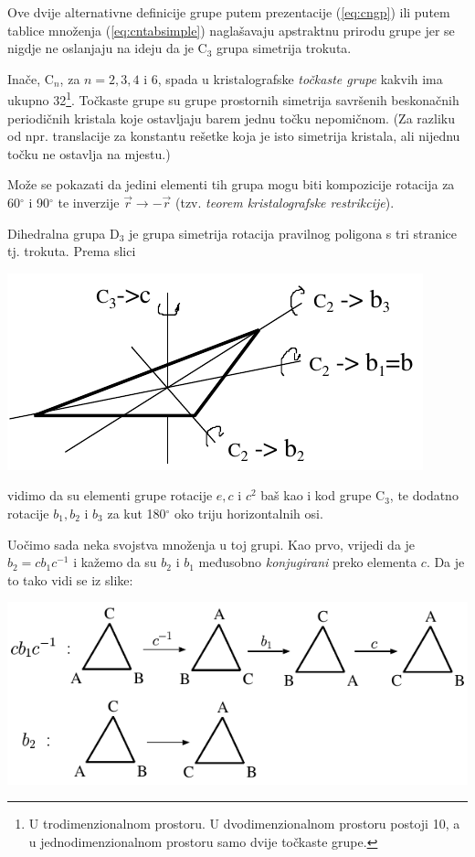 Ove dvije alternativne definicije grupe putem prezentacije (\ref{eq:cngp}) ili
putem tablice množenja (\ref{eq:cntabsimple}) 
naglašavaju apstraktnu prirodu grupe jer se nigdje ne oslanjaju
na ideju da je C$_3$ grupa simetrija trokuta.

Inače, C$_n$, za $n=2,3,4$ i $6$, spada u kristalografske \emph{točkaste grupe} kakvih
ima ukupno 32\footnote{U trodimenzionalnom prostoru. U dvodimenzionalnom prostoru postoji 10, a u
jednodimenzionalnom prostoru samo dvije točkaste grupe.}. 
Točkaste grupe su grupe prostornih simetrija savršenih beskonačnih
periodičnih kristala koje ostavljaju barem jednu točku nepomičnom. (Za
razliku od npr. translacije za konstantu rešetke koja je isto simetrija
kristala, ali nijednu točku ne ostavlja na mjestu.)
  
Može se pokazati da jedini elementi tih grupa mogu biti kompozicije
rotacija za 60$^\circ$ i 90$^\circ$ te inverzije $\vec{r}\to -\vec{r}$
(tzv. \emph{teorem kristalografske restrikcije}).
   

\begin{primjer}
    Dihedralna grupa $\mathrm{D}_3$ je grupa simetrija rotacija pravilnog poligona s tri
    stranice tj. trokuta.  Prema slici
    \begin{center}
    \includegraphics[scale=1.0]{pics/D3}
    \end{center}
vidimo da su elementi grupe rotacije $e, c$ i  $c^2$ baš kao i kod grupe $\mathrm{C}_3$, te
dodatno rotacije $b_1, b_2$ i $b_3$ za kut 180$^\circ$ oko triju horizontalnih
osi.
\end{primjer}

Uočimo sada neka svojstva množenja u toj grupi. Kao prvo, vrijedi
da je $b_2 = c b_1 c^{-1}$ i kažemo da su $b_2$ i $b_1$ međusobno
\emph{konjugirani} preko elementa $c$. Da je to tako vidi
se iz slike:

\centerline{\includegraphics[scale=1.0]{pics/cbc}}

